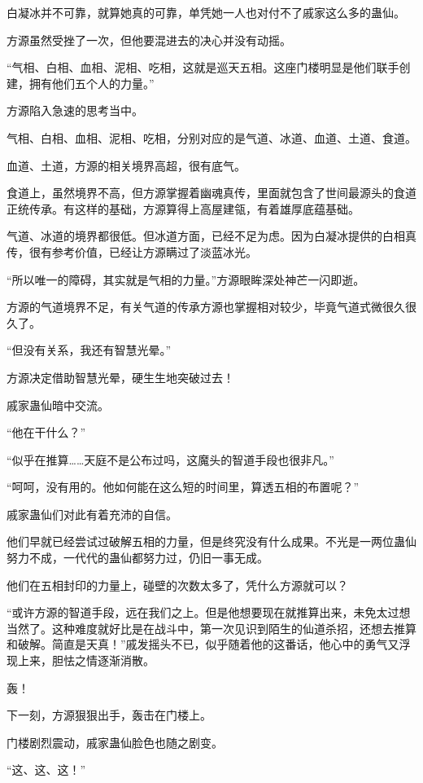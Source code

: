 \begin{this_body}
白凝冰并不可靠，就算她真的可靠，单凭她一人也对付不了戚家这么多的蛊仙。

方源虽然受挫了一次，但他要混进去的决心并没有动摇。

“气相、白相、血相、泥相、吃相，这就是巡天五相。这座门楼明显是他们联手创建，拥有他们五个人的力量。”

方源陷入急速的思考当中。

气相、白相、血相、泥相、吃相，分别对应的是气道、冰道、血道、土道、食道。

血道、土道，方源的相关境界高超，很有底气。

食道上，虽然境界不高，但方源掌握着幽魂真传，里面就包含了世间最源头的食道正统传承。有这样的基础，方源算得上高屋建瓴，有着雄厚底蕴基础。

气道、冰道的境界都很低。但冰道方面，已经不足为虑。因为白凝冰提供的白相真传，很有参考价值，已经让方源瞒过了淡蓝冰光。

“所以唯一的障碍，其实就是气相的力量。”方源眼眸深处神芒一闪即逝。

方源的气道境界不足，有关气道的传承方源也掌握相对较少，毕竟气道式微很久很久了。

“但没有关系，我还有智慧光晕。”

方源决定借助智慧光晕，硬生生地突破过去！

戚家蛊仙暗中交流。

“他在干什么？”

“似乎在推算……天庭不是公布过吗，这魔头的智道手段也很非凡。”

“呵呵，没有用的。他如何能在这么短的时间里，算透五相的布置呢？”

戚家蛊仙们对此有着充沛的自信。

他们早就已经尝试过破解五相的力量，但是终究没有什么成果。不光是一两位蛊仙努力不成，一代代的蛊仙都努力过，仍旧一事无成。

他们在五相封印的力量上，碰壁的次数太多了，凭什么方源就可以？

“或许方源的智道手段，远在我们之上。但是他想要现在就推算出来，未免太过想当然了。这种难度就好比是在战斗中，第一次见识到陌生的仙道杀招，还想去推算和破解。简直是天真！”戚发摇头不已，似乎随着他的这番话，他心中的勇气又浮现上来，胆怯之情逐渐消散。

轰！

下一刻，方源狠狠出手，轰击在门楼上。

门楼剧烈震动，戚家蛊仙脸色也随之剧变。

“这、这、这！”


\end{this_body}
